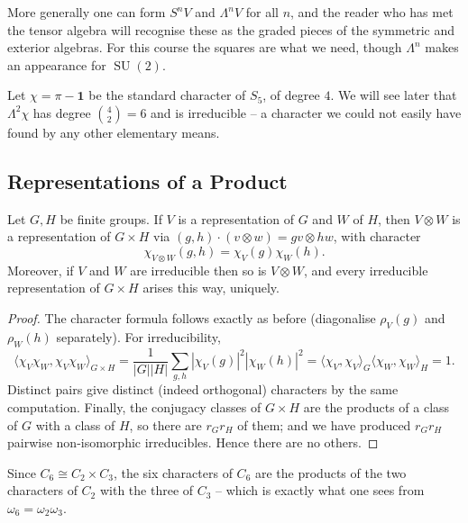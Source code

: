 \documentclass[a4paper]{scrartcl}
\newcommand{\SU}{\operatorname{SU}}
\newcommand{\ip}[2]{\langle #1, #2 \rangle}
\begin{document}
\begin{remark}
	More generally one can form $S^nV$ and $\Lambda^nV$ for all $n$, and the reader who has met the tensor algebra will recognise these as the graded pieces of the symmetric and exterior algebras. For this course the squares are what we need, though $\Lambda^n$ makes an appearance for $\SU(2)$.
\end{remark}

\begin{example}
	Let $\chi = \pi - \mathbf 1$ be the standard character of $S_5$, of degree $4$. We will see later that $\Lambda^2\chi$ has degree $\binom42 = 6$ and is irreducible -- a character we could not easily have found by any other elementary means.
\end{example}

\subsection{Representations of a Product}

\begin{proposition}
	Let $G, H$ be finite groups. If $V$ is a representation of $G$ and $W$ of $H$, then $V\otimes W$ is a representation of $G\times H$ via $(g,h)\cdot(v\otimes w) = gv\otimes hw$, with character
	$$\chi_{V\otimes W}(g,h) = \chi_V(g)\chi_W(h).$$
	Moreover, if $V$ and $W$ are irreducible then so is $V\otimes W$, and every irreducible representation of $G\times H$ arises this way, uniquely.
\end{proposition}
\begin{proof}
	The character formula follows exactly as before (diagonalise $\rho_V(g)$ and $\rho_W(h)$ separately). For irreducibility,
	$$\ip{\chi_V\chi_W}{\chi_V\chi_W}_{G\times H} = \frac1{|G||H|}\sum_{g,h}|\chi_V(g)|^2|\chi_W(h)|^2 = \ip{\chi_V}{\chi_V}_G\ip{\chi_W}{\chi_W}_H = 1.$$
	Distinct pairs give distinct (indeed orthogonal) characters by the same computation. Finally, the conjugacy classes of $G\times H$ are the products of a class of $G$ with a class of $H$, so there are $r_Gr_H$ of them; and we have produced $r_Gr_H$ pairwise non-isomorphic irreducibles. Hence there are no others.
\end{proof}

\begin{example}
	Since $C_6 \cong C_2\times C_3$, the six characters of $C_6$ are the products of the two characters of $C_2$ with the three of $C_3$ -- which is exactly what one sees from $\omega_6 = \omega_2\omega_3$.
\end{example}
\end{document}
